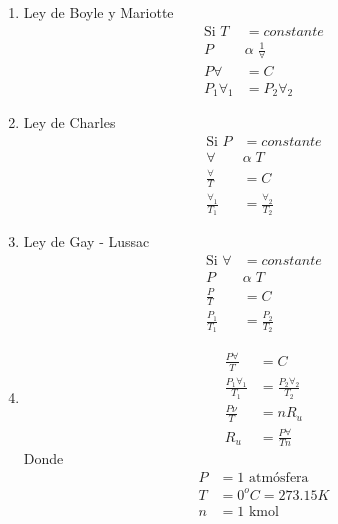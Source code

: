 \begin{enumerate}
    \item Ley de Boyle y Mariotte
        \[
            \begin{split}
                \text{Si }T & = constante \\
                P \; & \alpha \; \frac{ 1 }{ \forall } \\
                P \forall & = C \\
                P_{ 1 } \forall_{ 1 } & = P_{ 2 } \forall_{ 2 }  
            \end{split}
        \]
    \item Ley de Charles
        \[
            \begin{split}
                \text{Si }P & = constante \\
                \forall\; & \alpha \; T \\
                \frac{ \forall }{ T } & = C \\
                \frac{ \forall_{1} }{ T_{1} } & = \frac{ \forall_{2} }{ T_{2} } 
            \end{split}
        \]
    \item Ley de Gay - Lussac
        \[
            \begin{split}
                \text{Si } \forall & = constante \\
                P \; & \alpha \; T \\
                \frac{ P }{ T } & = C \\
                \frac{ P_{1} }{ T_{1} } & = \frac{ P_{2} }{ T_{2} } 
            \end{split}
        \]
    \item 
        \[
            \begin{split}
                \frac{ P \forall }{ T } & = C \\
                \frac{ P_{1} \forall_{1} }{ T_{1} } & = \frac{ P_{2} \forall_{2} }{ T_{2} } \\
                \frac{ P \nu }{ T } & = nR_{u} \\
                R_{u} & = \frac{ P \forall }{ Tn }
            \end{split}
        \]
        Donde 
        \[
            \begin{split}
                P & = 1 \text{ atmósfera} \\
                T & = 0^{o}C = 273.15K \\
                n & = 1 \text{ kmol} \\

\end{split}\]
\end{enumerate}
